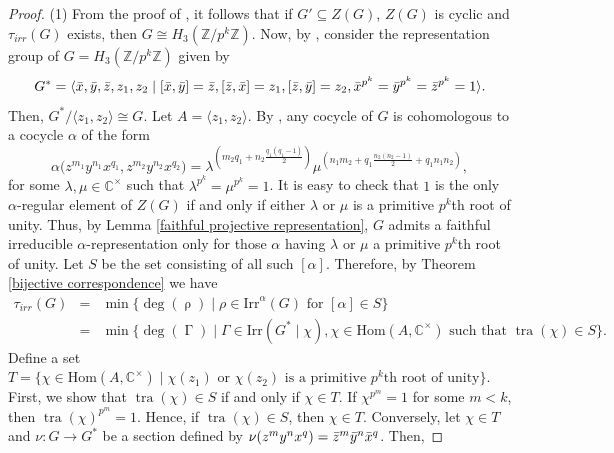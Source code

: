 \documentclass[a4paper,11pt]{amsart}
\numberwithin{equation}{section}
\numberwithin{equation}{subsection}
\newcommand{\C}{\mathbb{C}}
\newcommand{\Z}{\mathbb{Z}}
\newcommand{\Hom}{\mathrm{Hom}}
\newcommand{\x}{\Bar{x}}
\newcommand{\y}{\Bar{y}}
\newcommand{\z}{\Bar{z}}
\begin{document}
\begin{proof}(1)  %
	From the proof of \cite[Proposition 7.6]{NG}, it follows that if $G' \subseteq Z(G)$, $Z(G)$ is cyclic and $\tau_{irr}(G)$ exists, then $G \cong H_{3}(\Z/p^k\Z)$.
	Now, by \cite[Theorem 1.2]{hatui}, consider the representation group of $G= H_{3}(\Z/p^k\Z)$ given by
	$$G^* = \langle \x, \y, \z, z_1, z_2 \mid [\x, \y] = \z, [\z, \x] = z_1, [\z, \y] = z_2, 
	\x^{p^k} = \y^{p^k} = \z^{p^k} = 1 \rangle. $$
	Then, $G^*/\langle z_1, z_2 \rangle \cong G$. Let $A= \langle z_1, z_2 \rangle$.
	By \cite[Lemma 2.2]{hatui}, any cocycle of $G$ is cohomologous to a cocycle $\alpha$ of the form 
	\[
	\alpha\big(z^{m_1}y^{n_1}x^{q_1}, z^{m_2}y^{n_2}x^{q_2}\big) = \lambda^{(m_2q_1 + n_2 \frac{q_1(q_1-1)}{2})} \mu^{(n_1m_2+q_1 \frac{n_2(n_2-1)}{2}+q_1n_1n_2)} , 
	\]
	for some $\lambda, \mu \in \mathbb{C}^{\times}$ such that $\lambda^{p^k} = \mu^{p^k} = 1$.  
	It is easy to check that $1$ is the only $\alpha$-regular element of $Z(G)$ if and only if either $\lambda$ or $\mu$ is a primitive $p^k$th root of unity. 
	Thus, by Lemma \ref{faithful projective representation}, $G$ admits a faithful irreducible $\alpha$-representation only for those $\alpha$ having $\lambda$ or $\mu$ a primitive $p^k$th root of unity. Let $S$ be the set consisting of all such $[\alpha]$. 
	Therefore, by Theorem \ref{bijective correspondence} we have
	\begin{eqnarray*}
		\tau_{irr}(G)&=&\operatorname{min}\{\operatorname{deg}(\operatorname{\rho})\mid \rho \in \mathrm{Irr}^\alpha(G) \text{ for } [\alpha] \in S\}  \\
		&=&\operatorname{min}\{\operatorname{deg}(\operatorname{\Gamma}) \mid \Gamma \in \mathrm{Irr}(G^*\mid \chi), \chi\in \Hom(A, \C^\times) \text{ such that } \operatorname{tra}(\chi) \in S\}.
	\end{eqnarray*}
	Define a set $T=\{\chi \in \Hom(A,\C^\times) \mid \chi(z_1) \text{ or } \chi(z_2) \text{ is a primitive } p^k\text{th root of unity} \}$.
	First, we show that $\operatorname{tra}(\chi) \in S$ if and only if $\chi \in T$. If $\chi^{p^m}=1$ for some $m<k$, then $\operatorname{tra}(\chi)^{p^m}=1$.   
	Hence, if $\operatorname{tra}(\chi) \in S$, then $\chi \in T$. Conversely, let $\chi \in T$ and $\nu: G \to G^*$ be a section defined by $\nu(z^{m}y^{n}x^{q}) = \z^{m}\y^{n}\x^{q}$. Then, 

\end{proof}
\end{document}
